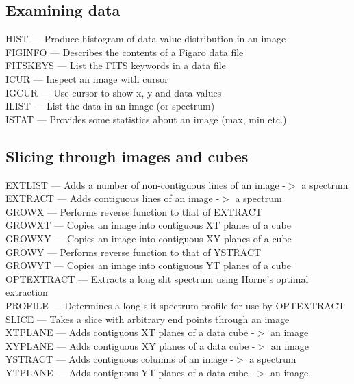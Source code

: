\documentclass[11pt,twoside]{article}
\newcommand{\htmlref}[2]{#1}
\begin{document}

\subsection{\label{classifexamin}Examining data}

\htmlref{HIST}{HIST} --- Produce histogram of data value distribution in an image\\
\htmlref{FIGINFO}{FIGINFO} --- Describes the contents of a Figaro data file\\
\htmlref{FITSKEYS}{FITSKEYS} --- List the FITS keywords in a data file\\
\htmlref{ICUR}{ICUR} --- Inspect an image with cursor\\
\htmlref{IGCUR}{IGCUR} --- Use cursor to show x, y and data values\\
\htmlref{ILIST}{ILIST} --- List the data in an image (or spectrum)\\
\htmlref{ISTAT}{ISTAT} --- Provides some statistics about an image (max, min etc.)


\subsection{\label{classifslices}Slicing through images and cubes}

\htmlref{EXTLIST}{EXTLIST} --- Adds a number of non-contiguous lines of an image -$>$ a spectrum\\
\htmlref{EXTRACT}{EXTRACT} --- Adds contiguous lines of an image -$>$ a spectrum\\
\htmlref{GROWX}{GROWX} --- Performs reverse function to that of EXTRACT\\
\htmlref{GROWXT}{GROWXT} --- Copies an image into contiguous XT planes of a cube\\
\htmlref{GROWXY}{GROWXY} --- Copies an image into contiguous XY planes of a cube\\
\htmlref{GROWY}{GROWY} --- Performs reverse function to that of YSTRACT\\
\htmlref{GROWYT}{GROWYT} --- Copies an image into contiguous YT planes of a cube\\
\htmlref{OPTEXTRACT}{OPTEXTRACT} --- Extracts a long slit spectrum using Horne's optimal extraction\\
\htmlref{PROFILE}{PROFILE} --- Determines a long slit spectrum profile for use by OPTEXTRACT\\
\htmlref{SLICE}{SLICE} --- Takes a slice with arbitrary end points through an image\\
\htmlref{XTPLANE}{XTPLANE} --- Adds contiguous XT planes of a data cube -$>$ an image\\
\htmlref{XYPLANE}{XYPLANE} --- Adds contiguous XY planes of a data cube -$>$ an image\\
\htmlref{YSTRACT}{YSTRACT} --- Adds contiguous columns of an image -$>$ a spectrum\\
\htmlref{YTPLANE}{YTPLANE} --- Adds contiguous YT planes of a data cube -$>$ an image
\end{document}
